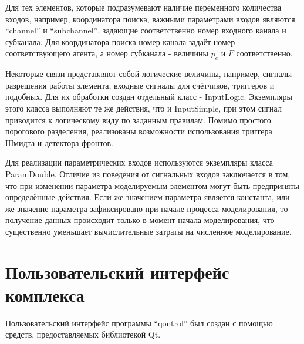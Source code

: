 Для тех элементов, которые подразумевают наличие переменного количества входов,
например, координатора поиска, важными параметрами входов являются
``channel'' и ``subchannel'', задающие соответственно
номер входного канала и субканала. Для координатора поиска
номер канала задаёт номер соответствующего агента,
а номер субканала - величины $p_e$ и $F$ соответственно.

Некоторые связи представляют собой логические величины,
например, сигналы разрешения работы элемента,
входные сигналы для счётчиков, триггеров и подобных.
Для их обработки создан отдельный класс - InputLogic.
Экземпляры этого класса выполняют те же действия,
что и InputSimple, при этом сигнал приводится
к логическому виду по заданным правилам.
Помимо простого порогового разделения,
реализованы возможности использования триггера Шмидта
и детектора фронтов.

Для реализации параметрических входов используются экземпляры класса ParamDouble.
Отличие из поведения от сигнальных входов заключается в том,
что при изменении параметра моделируемым элементом могут быть предприняты определённые
действия. Если же значением параметра является константа, или же
значение параметра зафиксировано при начале процесса моделирования,
то получение данных происходит только в момент начала моделирования,
что существенно уменьшает вычислительные затраты на численное моделирование.









\section{Пользовательский интерфейс комплекса} %

Пользовательский интерфейс программы ``qontrol'' был создан с помощью
средств, предоставляемых библиотекой Qt.

